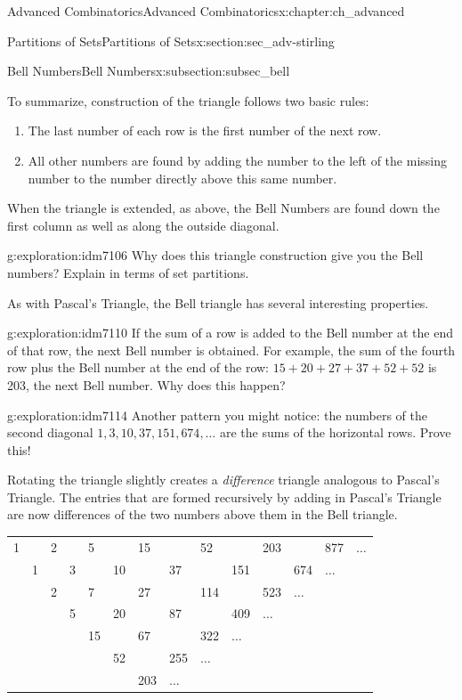 \documentclass[oneside,10pt,]{book}
\numberwithin{equation}{chapter}
\begin{document}
\begin{chapterptx}{Advanced Combinatorics}{}{Advanced Combinatorics}{}{}{x:chapter:ch_advanced}
\begin{sectionptx}{Partitions of Sets}{}{Partitions of Sets}{}{}{x:section:sec_adv-stirling}
\begin{subsectionptx}{Bell Numbers}{}{Bell Numbers}{}{}{x:subsection:subsec_bell}
\begin{sidebyside}{1}{0.15}{0.15}{0}
\end{sidebyside}%
\par
To summarize, construction of the triangle follows two basic rules:%
\begin{enumerate}
\item{}The last number of each row is the first number of the next row.%
\item{}All other numbers are found by adding the number to the left of the missing number to the number directly above this same number.%
\end{enumerate}
When the triangle is extended, as above, the Bell Numbers are found down the first column as well as along the outside diagonal.%
\begin{exploration}{}{g:exploration:idm7106}%
Why does this triangle construction give you the Bell numbers?  Explain in terms of set partitions.%
\end{exploration}
As with Pascal's Triangle, the Bell triangle has several interesting properties.%
\begin{exploration}{}{g:exploration:idm7110}%
If the sum of a row is added to the Bell number at the end of that row, the next Bell number is obtained. For example, the sum of the fourth row plus the Bell number at the end of the row: \(15 + 20 + 27 + 37 + 52 + 52\) is 203, the next Bell number.  Why does this happen?%
\end{exploration}
\begin{exploration}{}{g:exploration:idm7114}%
Another pattern you might notice: the numbers of the second diagonal \(1, 3, 10, 37, 151, 674, \ldots\) are the sums of the horizontal rows.  Prove this!%
\end{exploration}
Rotating the triangle slightly creates a \emph{difference} triangle analogous to Pascal's Triangle. The entries that are formed recursively by adding in Pascal's Triangle are now differences of the two numbers above them in the Bell triangle.%
\begin{sidebyside}{1}{0}{0}{0}%
\begin{sbspanel}{1}%
{\centering%
\begin{tabular}{llllllllllllll}
1&&2&&5&&15&&52&&203&&877&\(\ldots\)\tabularnewline[0pt]
&1&&3&&10&&37&&151&&674&\(\ldots\)&\tabularnewline[0pt]
&&2&&7&&27&&114&&523&\(\ldots\)&&\tabularnewline[0pt]
&&&5&&20&&87&&409&\(\ldots\)&&&\tabularnewline[0pt]
&&&&15&&67&&322&\(\ldots\)&&&&\tabularnewline[0pt]
&&&&&52&&255&\(\ldots\)&&&&&\tabularnewline[0pt]
&&&&&&203&\(\ldots\)&&&&&&
\end{tabular}
}
\end{sbspanel}
\end{sidebyside}
\end{subsectionptx}
\end{sectionptx}
\end{chapterptx}
\end{document}
